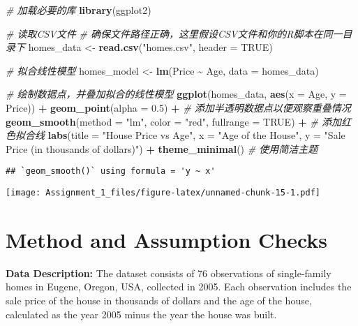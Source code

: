 \documentclass[
]{article}
\newenvironment{Shaded}{\begin{snugshade}}{\end{snugshade}}
\newcommand{\AttributeTok}[1]{\textcolor[rgb]{0.13,0.29,0.53}{#1}}
\newcommand{\CommentTok}[1]{\textcolor[rgb]{0.56,0.35,0.01}{\textit{#1}}}
\newcommand{\ConstantTok}[1]{\textcolor[rgb]{0.56,0.35,0.01}{#1}}
\newcommand{\FloatTok}[1]{\textcolor[rgb]{0.00,0.00,0.81}{#1}}
\newcommand{\FunctionTok}[1]{\textcolor[rgb]{0.13,0.29,0.53}{\textbf{#1}}}
\newcommand{\NormalTok}[1]{#1}
\newcommand{\OtherTok}[1]{\textcolor[rgb]{0.56,0.35,0.01}{#1}}
\newcommand{\SpecialCharTok}[1]{\textcolor[rgb]{0.81,0.36,0.00}{\textbf{#1}}}
\newcommand{\StringTok}[1]{\textcolor[rgb]{0.31,0.60,0.02}{#1}}
\begin{document}
\begin{Shaded}
\begin{Highlighting}[]
\CommentTok{\# 加载必要的库}
\FunctionTok{library}\NormalTok{(ggplot2)}

\CommentTok{\# 读取CSV文件}
\CommentTok{\# 确保文件路径正确，这里假设CSV文件和你的R脚本在同一目录下}
\NormalTok{homes\_data }\OtherTok{\textless{}{-}} \FunctionTok{read.csv}\NormalTok{(}\StringTok{"homes.csv"}\NormalTok{, }\AttributeTok{header =} \ConstantTok{TRUE}\NormalTok{)}

\CommentTok{\# 拟合线性模型}
\NormalTok{homes\_model }\OtherTok{\textless{}{-}} \FunctionTok{lm}\NormalTok{(Price }\SpecialCharTok{\textasciitilde{}}\NormalTok{ Age, }\AttributeTok{data =}\NormalTok{ homes\_data)}

\CommentTok{\# 绘制数据点，并叠加拟合的线性模型}
\FunctionTok{ggplot}\NormalTok{(homes\_data, }\FunctionTok{aes}\NormalTok{(}\AttributeTok{x =}\NormalTok{ Age, }\AttributeTok{y =}\NormalTok{ Price)) }\SpecialCharTok{+}
  \FunctionTok{geom\_point}\NormalTok{(}\AttributeTok{alpha =} \FloatTok{0.5}\NormalTok{) }\SpecialCharTok{+}  \CommentTok{\# 添加半透明数据点以便观察重叠情况}
  \FunctionTok{geom\_smooth}\NormalTok{(}\AttributeTok{method =} \StringTok{"lm"}\NormalTok{, }\AttributeTok{color =} \StringTok{"red"}\NormalTok{, }\AttributeTok{fullrange =} \ConstantTok{TRUE}\NormalTok{) }\SpecialCharTok{+}  \CommentTok{\# 添加红色拟合线}
  \FunctionTok{labs}\NormalTok{(}\AttributeTok{title =} \StringTok{"House Price vs Age"}\NormalTok{, }\AttributeTok{x =} \StringTok{"Age of the House"}\NormalTok{, }\AttributeTok{y =} \StringTok{"Sale Price (in thousands of dollars)"}\NormalTok{) }\SpecialCharTok{+}
  \FunctionTok{theme\_minimal}\NormalTok{()  }\CommentTok{\# 使用简洁主题}
\end{Highlighting}
\end{Shaded}

\begin{verbatim}
## `geom_smooth()` using formula = 'y ~ x'
\end{verbatim}

\texttt{[image: Assignment\_1\_files/figure-latex/unnamed-chunk-15-1.pdf]}

\section{Method and Assumption
Checks}\label{method-and-assumption-checks-2}

\textbf{Data Description:} The dataset consists of 76 observations of
single-family homes in Eugene, Oregon, USA, collected in 2005. Each
observation includes the sale price of the house in thousands of dollars
and the age of the house, calculated as the year 2005 minus the year the
house was built.
\end{document}
